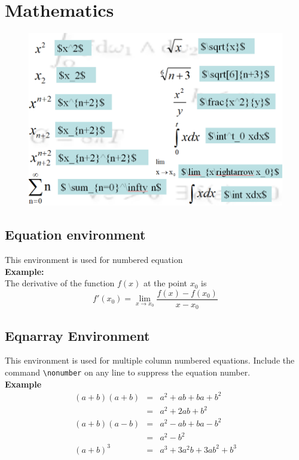 \documentclass[12pt,a4paper]{report}
\begin{document}
\section{Mathematics}
\begin{figure}[H]
    \centering
    \includegraphics[width=\textwidth]{math.png}
\end{figure}
\subsection{Equation environment}
This environment is used for numbered equation\\
\textbf{Example:}\\
The derivative of the function $f(x)$ at the point $x_0$ is
\begin{equation}
f'(x_0) =
\lim_{x \rightarrow x_0}
\frac{f(x) - f(x_0)}{x - x_0}
\end{equation}
\subsection{Eqnarray Environment}
This environment is used for multiple column numbered equations. Include the command \verb!\nonumber! on any line to suppress the equation number.\\
\textbf{Example}\\
\begin{eqnarray}
(a + b)(a + b) & = & a^2 + ab + ba + b^2 
\nonumber \\
& = & a^2 + 2ab + b^2 \\
(a + b)(a - b) & = & a^2 - ab + ba - b^2
\nonumber \\
& = & a^2 - b^2\\
(a + b)^3 & = & a^3 + 3a^2b + 3ab^2 + b^3 
\end{eqnarray}
\end{document}
